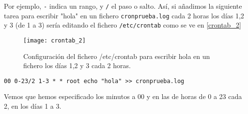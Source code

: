 Por ejemplo, \verb|-| indica un rango, y \verb|/| el paso o salto. Así, si añadimos la siguiente tarea para escribir "hola" en un fichero \verb|cronprueba.log| cada 2 horas los días 1,2 y 3 (de 1 a 3) sería editando el fichero \verb|/etc/crontab| como se ve en \eqref{crontab_2}

\begin{figure}
\begin{center}
\caption{Configuración del fichero /etc/crontab para escribir hola en un fichero los días 1,2 y 3 cada 2 horas.}
\label{crontab_2}
\texttt{[image: crontab\_2]}
\end{center}
\end{figure}

\begin{verbatim}
00 0-23/2 1-3 * * root echo "hola" >> cronprueba.log
\end{verbatim}

Vemos que hemos especificado los minutos a 00 y en las de horas de 0 a 23 cada 2, en los días 1 a 3.










